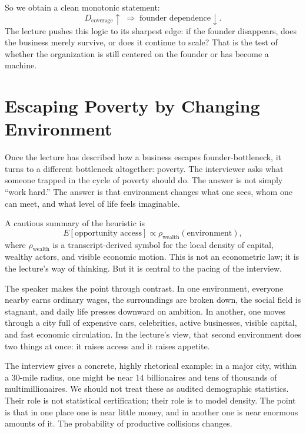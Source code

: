So we obtain a clean monotonic statement:
\begin{equation}
D_{\text{coverage}}\uparrow \;\Rightarrow\; \text{founder dependence}\downarrow.
\end{equation}
The lecture pushes this logic to its sharpest edge: if the founder disappears, does the business merely survive, or does it continue to scale? That is the test of whether the organization is still centered on the founder or has become a machine.

\section{Escaping Poverty by Changing Environment}

Once the lecture has described how a business escapes founder-bottleneck, it turns to a different bottleneck altogether: poverty. The interviewer asks what someone trapped in the cycle of poverty should do. The answer is not simply ``work hard.'' The answer is that environment changes what one sees, whom one can meet, and what level of life feels imaginable.

A cautious summary of the heuristic is
\begin{equation}
E[\text{opportunity access}] \propto \rho_{\text{wealth}}(\text{environment}),
\end{equation}
where \(\rho_{\text{wealth}}\) is a transcript-derived symbol for the local density of capital, wealthy actors, and visible economic motion. This is not an econometric law; it is the lecture's way of thinking. But it is central to the pacing of the interview.

The speaker makes the point through contrast. In one environment, everyone nearby earns ordinary wages, the surroundings are broken down, the social field is stagnant, and daily life presses downward on ambition. In another, one moves through a city full of expensive cars, celebrities, active businesses, visible capital, and fast economic circulation. In the lecture's view, that second environment does two things at once: it raises access and it raises appetite.

The interview gives a concrete, highly rhetorical example: in a major city, within a 30-mile radius, one might be near 14 billionaires and tens of thousands of multimillionaires. We should not treat these as audited demographic statistics. Their role is not statistical certification; their role is to model density. The point is that in one place one is near little money, and in another one is near enormous amounts of it. The probability of productive collisions changes.

